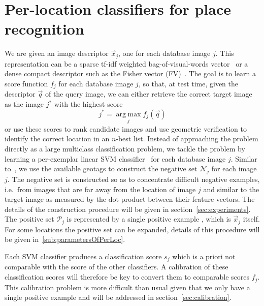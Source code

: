 \section{Per-location classifiers for place recognition}
\label{sec:classifiers}
   We are given an image descriptor $\vec{x}_j$, one for each database image $j$. This representation can be a sparse tf-idf weighted bag-of-visual-words vector~\cite{Sivic03} or a dense compact descriptor such as the Fisher vector (FV)~\cite{Jegou12}. The goal is to learn 
   a score \textcolor{petr}{function}
   $f_j$ for each database image $j$, so that, at test time, given the descriptor $\vec{q}$ of the query image, we can either retrieve the correct target image as the image $j^*$ with the highest score
   \begin{equation}
   \label{eq:class}
    j^*=\operatorname*{arg\;max}_{j} f_j(\vec{q}) 
   \end{equation}
   \noindent
   or use these scores to rank candidate images and use geometric verification to identify the correct location in an $n$-best list.
   Instead of approaching the problem directly as a large multiclass classification problem, we tackle the problem by learning a per-exemplar linear SVM classifier~\cite{Malisiewicz11}  for each database image $j$.
   Similar to~\cite{Knopp2010}, we use the available geotags to construct the negative set $\mathcal N_j$ for each image $j$. The negative set is constructed so as to concentrate difficult negative examples, i.e.\ from images that are far away from the location of image $j$ and similar to the target image as measured by the dot product between their feature vectors. The details of the construction procedure will be given in section~\ref{sec:experiments}.  The positive set $\mathcal P_j$ is represented by a single positive example
   , which is $\vec{x}_j$ itself. 
   \textcolor{petr}{
    For some locations the positive set can be expanded, details of this procedure will be given in~\ref{sub:parametersOfPerLoc}.
   }

   Each SVM classifier produces a \textcolor{petr}{classification} score $s_j$ which is a priori not comparable with the score of the other classifiers. A calibration of these \textcolor{petr}{classification} scores will therefore be key to convert them to comparable scores $f_j$. This calibration problem is more difficult than usual given that we only have a single positive example and will be addressed in section~\ref{sec:calibration}.
   
